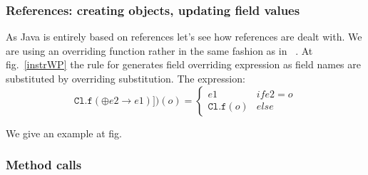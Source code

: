 \subsubsection{References: creating objects, updating field values}
As Java is entirely based on references let's see how references are dealt with. 
We are using an overriding function rather in the same fashion as in ~\cite{B00ppp}. 
At fig.~\ref{instrWP} the rule for  generates field overriding expression 
as field names are substituted by overriding substitution. The expression: 
$$
 \texttt{Cl.f}(\oplus e2 \rightarrow e1)])(o) = \left\{ \begin{array} {ll}
						       e1              & if e2 = o \\
					               \texttt{Cl.f}(o)	& else 
	\end{array}\right. 
$$ 


We give an example at fig.%



\subsubsection{Method calls}
